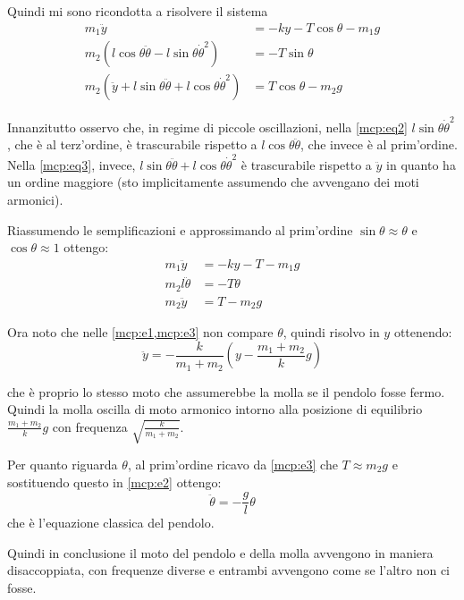 \documentclass[../main.tex]{subfiles}
\begin{document}
Quindi mi sono ricondotta a risolvere il sistema
\begin{align}
	m_1\ddot{y} &=-ky-T\cos\theta-m_1g \label{mcp:eq1} \\
	m_2(l\cos\theta \ddot\theta-l\sin\theta\dot\theta^2) &=-T\sin\theta \label{mcp:eq2} \\
	m_2(\ddot{y}+l\sin\theta\ddot\theta+l\cos\theta\dot\theta^2) &=T\cos\theta-m_2g \label{mcp:eq3}
\end{align}

Innanzitutto osservo che, in regime di piccole oscillazioni, nella \cref{mcp:eq2} $l\sin\theta\dot\theta^2$, 
che è al terz'ordine,
è trascurabile rispetto a $l\cos\theta \ddot\theta$, che invece è al prim'ordine.
Nella \cref{mcp:eq3}, invece, $l\sin\theta\ddot\theta+l\cos\theta\dot\theta^2$ è trascurabile rispetto
a $\ddot{y}$ in quanto ha un ordine maggiore (sto implicitamente assumendo che avvengano dei moti armonici).

Riassumendo le semplificazioni e approssimando al prim'ordine $\sin\theta\approx\theta$ e $\cos\theta\approx 1$ ottengo:
\begin{align}
	m_1\ddot{y} &=-ky-T-m_1g \label{mcp:e1} \\
	m_2l\ddot\theta &=-T\theta \label{mcp:e2} \\
	m_2\ddot{y} &=T-m_2g \label{mcp:e3}
\end{align}

Ora noto che nelle \cref{mcp:e1,mcp:e3} non compare $\theta$, quindi risolvo in $y$ ottenendo:
\begin{equation*}
	\ddot y=-\frac k{m_1+m_2}\left(y-\frac{m_1+m_2}k g\right)
\end{equation*}

che è proprio lo stesso moto che assumerebbe la molla se il pendolo fosse fermo. Quindi la molla oscilla di
moto armonico intorno alla posizione di equilibrio $\frac{m_1+m_2}k g$ con frequenza $\sqrt{\frac k{m_1+m_2}}$.

Per quanto riguarda $\theta$, al prim'ordine ricavo da \cref{mcp:e3} che $T\approx m_2g$ e sostituendo questo in
\cref{mcp:e2} ottengo:
\begin{equation*}
	\ddot \theta=-\frac gl \theta
\end{equation*}
che è l'equazione classica del pendolo.

Quindi in conclusione il moto del pendolo e della molla avvengono in maniera disaccoppiata, con frequenze diverse e
entrambi avvengono come se l'altro non ci fosse.
\end{document}

